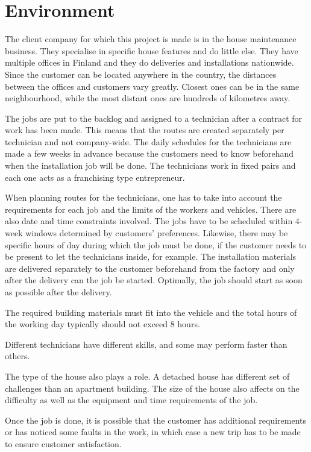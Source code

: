 \chapter{Environment}
\label{chapter:environment}

The client company for which this project is made is in the house maintenance business. They specialise in specific house features and do little else. They have multiple offices in Finland and they do deliveries and installations nationwide. Since the customer can be located anywhere in the country, the distances between the offices and customers vary greatly. Closest ones can be in the same neighbourhood, while the most distant ones are hundreds of kilometres away.

The jobs are put to the backlog and assigned to a technician after a contract for work has been made. This means that the routes are created separately per technician and not company-wide. The daily schedules for the technicians are made a few weeks in advance because the customers need to know beforehand when the installation job will be done. The technicians work in fixed pairs and each one acts as a franchising type entrepreneur.

When planning routes for the technicians, one has to take into account the requirements for each job and the limits of the workers and vehicles. There are also date and time constraints involved. The jobs have to be scheduled within 4-week windows determined by customers' preferences. Likewise, there may be specific hours of day during which the job must be done, if the customer needs to be present to let the technicians inside, for example. The installation materials are delivered separately to the customer beforehand from the factory and only after the delivery can the job be started. Optimally, the job should start as soon as possible after the delivery.

The required building materials must fit into the vehicle and the total hours of the working day typically should not exceed 8 hours. 

Different technicians have different skills, and some may perform faster than others. 

The type of the house also plays a role. A detached house has different set of challenges than an apartment building. The size of the house also affects on the difficulty as well as the equipment and time requirements of the job.

Once the job is done, it is possible that the customer has additional requirements or has noticed some faults in the work, in which case a new trip has to be made to ensure customer satisfaction. 

